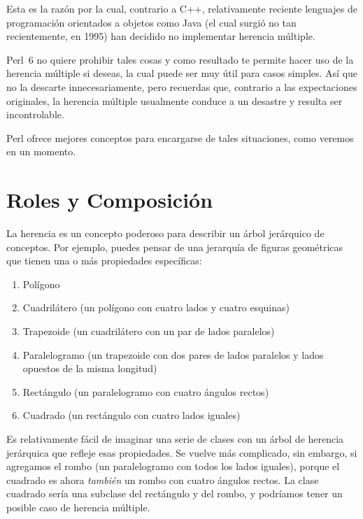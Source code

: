 Esta es la razón por la cual, contrario a C++, relativamente reciente lenguajes de programación orientados a objetos como Java (el cual surgió no tan recientemente, en 1995) han decidido no implementar herencia múltiple.

Perl~6 no quiere prohibir tales cosas y como resultado te permite
hacer uso de la herencia múltiple si deseas, la cual puede ser 
muy útil para casos simples. Así que no la descarte innecesariamente,
pero recuerdas que, contrario a las expectaciones originales, 
la herencia múltiple usualmente conduce a un desastre y resulta
ser incontrolable.

Perl ofrece mejores conceptos para encargarse de tales situaciones, como
veremos en un momento.

\section{Roles y Composición}

La herencia es un concepto poderoso para describir un árbol jerárquico de
conceptos. Por ejemplo, puedes pensar de una jerarquía de figuras geométricas
que tienen una o más propiedades específicas: 
\begin{enumerate}
\item Polígono

\item Cuadrilátero (un polígono con cuatro lados y cuatro esquinas)

\item Trapezoide (un cuadrilátero con un par de lados paralelos)

\item Paralelogramo (un trapezoide con dos pares de lados paralelos y lados
opuestos de la misma longitud)

\item Rectángulo (un paralelogramo con cuatro ángulos rectos)

\item Cuadrado (un rectángulo con cuatro lados iguales)
\end{enumerate}

Es relativamente fácil de imaginar una serie de clases con un árbol de
herencia jerárquica que refleje esas propiedades. Se vuelve más 
complicado, sin embargo, si agregamos el rombo (un paralelogramo con
todos los lados iguales), porque el cuadrado es ahora \emph{también}
un rombo con cuatro ángulos rectos. La clase cuadrado sería una 
subclase del rectángulo y del rombo, y podríamos tener un posible
caso de herencia múltiple.

